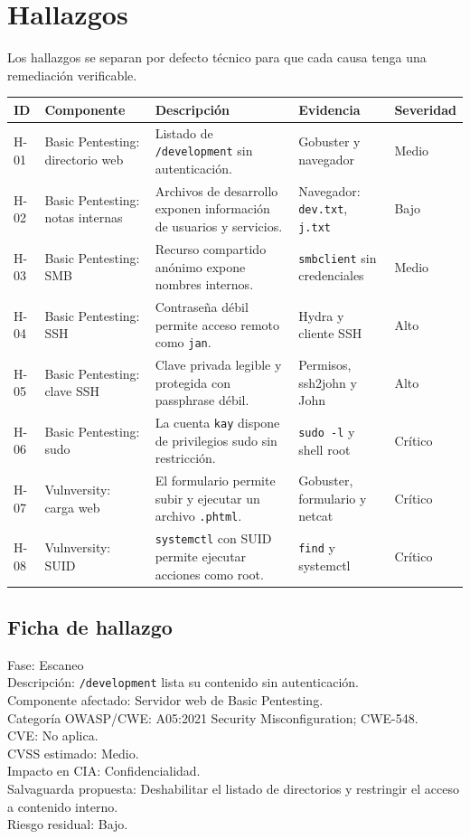 \documentclass[11pt,a4paper]{article}
\begin{document}
\section{Hallazgos}

Los hallazgos se separan por defecto técnico para que cada causa tenga una remediación verificable.

\begin{longtable}{@{}p{2.2cm}p{3.2cm}p{3cm}p{3.2cm}p{2cm}@{}}
\toprule
\textbf{ID} & \textbf{Componente} & \textbf{Descripción} & \textbf{Evidencia} & \textbf{Severidad}\\
\midrule
H-01 & Basic Pentesting: directorio web & Listado de \texttt{/development} sin autenticación. & Gobuster y navegador & Medio\\
\midrule
H-02 & Basic Pentesting: notas internas & Archivos de desarrollo exponen información de usuarios y servicios. & Navegador: \texttt{dev.txt}, \texttt{j.txt} & Bajo\\
\midrule
H-03 & Basic Pentesting: SMB & Recurso compartido anónimo expone nombres internos. & \texttt{smbclient} sin credenciales & Medio\\
\midrule
H-04 & Basic Pentesting: SSH & Contraseña débil permite acceso remoto como \texttt{jan}. & Hydra y cliente SSH & Alto\\
\midrule
H-05 & Basic Pentesting: clave SSH & Clave privada legible y protegida con passphrase débil. & Permisos, ssh2john y John & Alto\\
\midrule
H-06 & Basic Pentesting: sudo & La cuenta \texttt{kay} dispone de privilegios sudo sin restricción. & \texttt{sudo -l} y shell root & Crítico\\
\midrule
H-07 & Vulnversity: carga web & El formulario permite subir y ejecutar un archivo \texttt{.phtml}. & Gobuster, formulario y netcat & Crítico\\
\midrule
H-08 & Vulnversity: SUID & \texttt{systemctl} con SUID permite ejecutar acciones como root. & \texttt{find} y systemctl & Crítico\\
\bottomrule
\end{longtable}

\subsection{Ficha de hallazgo}
\begin{campo}
Fase: Escaneo\\
Descripción: \texttt{/development} lista su contenido sin autenticación.\\
Componente afectado: Servidor web de Basic Pentesting.\\
Categoría OWASP/CWE: A05:2021 Security Misconfiguration; CWE-548.\\
CVE: No aplica.\\
CVSS estimado: Medio.\\
Impacto en CIA: Confidencialidad.\\
Salvaguarda propuesta: Deshabilitar el listado de directorios y restringir el acceso a contenido interno.\\
Riesgo residual: Bajo.
\end{campo}
\end{document}
